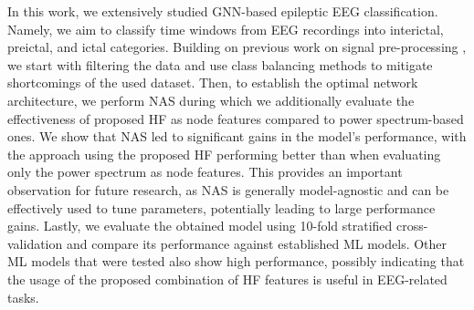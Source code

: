 \documentclass[a4paper,fleqn]{cas-sc}
\begin{document}
In this work, we extensively studied GNN-based epileptic EEG classification. Namely, we aim to classify time windows from EEG recordings into interictal, preictal, and ictal categories. Building on previous work on signal pre-processing \cite{MazurekPreprocessing}, we start with filtering the data and use class balancing methods to mitigate shortcomings of the used dataset. Then, to establish the optimal network architecture, we perform NAS during which we additionally evaluate the effectiveness of proposed HF as node features compared to power spectrum-based ones. We show that NAS led to significant gains in the model's performance, with the approach using the proposed HF performing better than when evaluating only the power spectrum as node features. This provides an important observation for future research, as NAS is generally model-agnostic and can be effectively used to tune parameters, potentially leading to large performance gains. Lastly, we evaluate the obtained model using 10-fold stratified cross-validation and compare its performance against established ML models. Other ML models that were tested also show high performance, possibly indicating that the usage of the proposed combination of HF features is useful in EEG-related tasks. 
\end{document}
